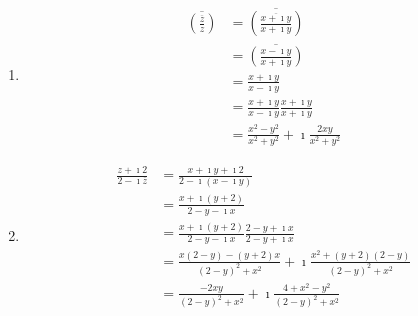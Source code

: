 {%
\begin{Solution}
  \label{solution ov ov z z}
  \begin{enumerate}
  \item
    \begin{align*}
      \overline{ \left( \frac{ \overline{z} }{ z } \right) }
      &= \overline{ \left( \frac{ \overline{x + \imath y} }{x + \imath y} \right) } 
      \\
      &= \overline{ \left( \frac{ x - \imath y }{ x + \imath y } \right) } 
      \\
      &= \frac{ x + \imath y }{ x - \imath y } 
      \\
      &= \frac{ x + \imath y }{ x - \imath y }  \frac{ x + \imath y }{ x + \imath y } 
      \\
      &= \frac{ x^2 - y^2 }{ x^2 + y^2 } + \imath \frac{ 2 x y }{ x^2 + y^2 }
    \end{align*}
  \item
    \begin{align*}
      \frac{ z + \imath 2 }{ 2 - \imath \overline{z} }
      &= \frac{ x + \imath y + \imath 2 }{ 2 - \imath (x - \imath y) } 
      \\
      &= \frac{ x + \imath ( y + 2 ) }{ 2 - y - \imath x } 
      \\
      &= \frac{ x + \imath ( y + 2 ) }{ 2 - y - \imath x } 
       \frac{ 2 - y + \imath x }{ 2 - y + \imath x } 
      \\
      &= \frac{ x (2 - y) - (y + 2) x }{ (2 - y)^2 + x^2 }
      + \imath \frac{ x^2 + (y + 2) (2 - y) }{ (2 - y)^2 + x^2 } 
      \\
      &= \frac{ - 2 x y }{ (2 - y)^2 + x^2 }
      + \imath \frac{ 4 + x^2 - y^2 }{ (2 - y)^2 + x^2 } 
    \end{align*}
  \end{enumerate}
\end{Solution}






}
